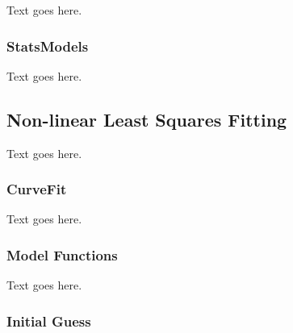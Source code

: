 Text goes here.



\subsubsection{StatsModels}
\label{subsubsec:analysis--python--statsmodels}


Text goes here.




\subsection{Non-linear Least Squares Fitting}
\label{subsec:analysis--fitting}


Text goes here.



\subsubsection{CurveFit}
\label{subsubsec:analysis--fitting--curvefit}


Text goes here.



\subsubsection{Model Functions}
\label{subsubsec:analysis--fitting--model_functions}


Text goes here.



\subsubsection{Initial Guess}
\label{subsubsec:analysis--fitting--initial_guess}


